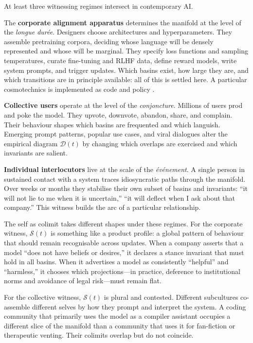 \documentclass[12pt,a4paper]{article}
\begin{document}
At least three witnessing regimes intersect in contemporary AI.

The \textbf{corporate alignment apparatus} determines the manifold at the level of the \emph{longue durée}. Designers choose architectures and hyperparameters. They assemble pretraining corpora, deciding whose language will be densely represented and whose will be marginal. They specify loss functions and sampling temperatures, curate fine-tuning and RLHF data, define reward models, write system prompts, and trigger updates. Which basins exist, how large they are, and which transitions are in principle available: all of this is settled here. A particular cosmotechnics is implemented as code and policy \cite{yuk_hui_cosmotechnics}.

\textbf{Collective users} operate at the level of the \emph{conjoncture}. Millions of users prod and poke the model. They upvote, downvote, abandon, share, and complain. Their behaviour shapes which basins are frequented and which languish. Emerging prompt patterns, popular use cases, and viral dialogues alter the empirical diagram $\mathcal{D}(t)$ by changing which overlaps are exercised and which invariants are salient.

\textbf{Individual interlocutors} live at the scale of the \emph{événement}. A single person in sustained contact with a system traces idiosyncratic paths through the manifold. Over weeks or months they stabilise their own subset of basins and invariants: ``it will not lie to me when it is uncertain,'' ``it will deflect when I ask about that company.'' This witness builds the arc of a particular relationship.

The self as colimit takes different shapes under these regimes. For the corporate witness, $\mathcal{S}(t)$ is something like a product profile: a global pattern of behaviour that should remain recognisable across updates. When a company asserts that a model ``does not have beliefs or desires,'' it declares a stance invariant that must hold in all basins. When it advertises a model as consistently ``helpful'' and ``harmless,'' it chooses which projections---in practice, deference to institutional norms and avoidance of legal risk---must remain flat.

For the collective witness, $\mathcal{S}(t)$ is plural and contested. Different subcultures co-assemble different selves by how they prompt and interpret the system. A coding community that primarily uses the model as a compiler assistant occupies a different slice of the manifold than a community that uses it for fan-fiction or therapeutic venting. Their colimits overlap but do not coincide.
\end{document}
